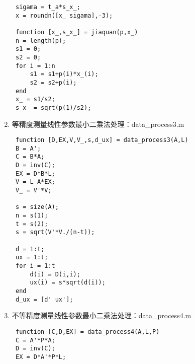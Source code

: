\begin{enumerate}
\begin{lstlisting}
 sigama = t_a*s_x_;
 x = roundn([x_ sigama],-3);
 
 function [x_,s_x_] = jiaquan(p,x_)
 n = length(p);
 s1 = 0;
 s2 = 0;
 for i = 1:n
     s1 = s1+p(i)*x_(i);
     s2 = s2+p(i);
 end
 x_ = s1/s2;
 s_x_ = sqrt(p(1)/s2);\end{lstlisting}
 \newpage
	\item 等精度测量线性参数最小二乘法处理：data\_process3.m
	\begin{lstlisting}
 function [D,EX,V,V_,s,d_ux] = data_process3(A,L)
 B = A';
 C = B*A;
 D = inv(C);
 EX = D*B*L;
 V = L-A*EX;
 V_ = V'*V;
 
 s = size(A);
 n = s(1);
 t = s(2);
 s = sqrt(V'*V./(n-t));
 
 d = 1:t;
 ux = 1:t;
 for i = 1:t
     d(i) = D(i,i);
     ux(i) = s*sqrt(d(i));
 end
 d_ux = [d' ux'];\end{lstlisting}
	\item 不等精度测量线性参数最小二乘法处理：data\_process4.m
	\begin{lstlisting}
 function [C,D,EX] = data_process4(A,L,P)
 C = A'*P*A;
 D = inv(C);
 EX = D*A'*P*L;\end{lstlisting}
\end{enumerate}